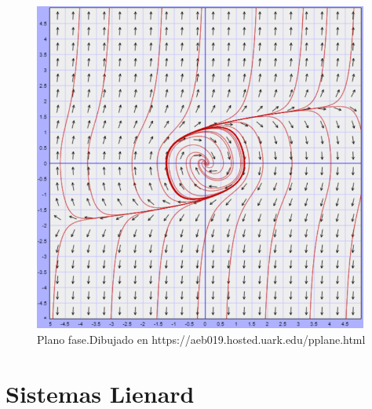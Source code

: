 \documentclass[12pt, a4paper]{report}
\begin{document}
\begin{figure}[h]
	\centering
	\includegraphics[width=11cm]{planorayleigh.png}
	\caption{Plano fase.Dibujado en https://aeb019.hosted.uark.edu/pplane.html}
\end{figure}

\newpage



\section{Sistemas Lienard}
\end{document}
